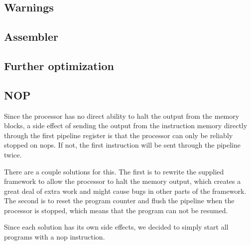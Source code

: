 \subsection{Warnings}

\subsection{Assembler}

\subsection{Further optimization}

\subsection{NOP}

Since the processor has no direct ability to halt the output from the memory blocks, a side effect of sending the output from the instruction memory directly through the first pipeline register is that the processor can only be reliably stopped on nops.
If not, the first instruction will be sent through the pipeline twice.

There are a couple solutions for this.
The first is to rewrite the supplied framework to allow the processor to halt the memory output, which creates a great deal of extra work and might cause bugs in other parts of the framework.
The second is to reset the program counter and flush the pipeline when the processor is stopped, which means that the program can not be resumed.

Since each solution has its own side effects, we decided to simply start all programs with a nop instruction.

